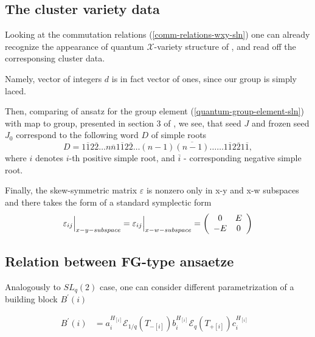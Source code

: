 \documentclass{article}
\newcommand{\lb}{\left (}
\newcommand{\rb}{\right )}
\newcommand{\lsb}{\left [}
\newcommand{\rsb}{\right ]}
\newcommand{\SB}[1]{\lsb #1 \rsb}
\newcommand{\ve}{\varepsilon}
\newcommand {\?}{\textit{???}}
\newcommand{\me}[0]{\mathcal{E}}
\newcommand{\Bp}[1]{B^{'}\lb #1 \rb}
\newcommand{\Tp}[1][]{T_{+ #1}}
\newcommand{\Tm}[1][]{T_{- #1}}
\newcommand{\delabel}[1]{(\ref{#1})}
\begin{document}
\subsection{The cluster variety data}

Looking at the commutation relations \delabel{comm-relations-wxy-sln} one can already
recognize the appearance of quantum $\mathcal{X}$-variety structure of \cite{FG1},
and read off the corresponsing cluster data.

Namely, vector of integers $d$ is in fact vector of ones, since our group is simply laced.

Then, comparing of ansatz for the group element \delabel{quantum-group-element-sln}
with map to group, presented in section 3 of \cite{FG2}, we see, that
seed $J$ and frozen seed $J_0$ correspond to the following word $D$ of simple roots
\begin{equation}
D = 1 \overline{1} 2 \overline{2} \dots n \overline{n} 1 \overline{1} 2 \overline{2} \dots (n - 1)\overline{(n-1)}
\dots \dots 1 \overline{1} 2 \overline{2} 1 \overline{1},
\end{equation}
where $i$ denotes $i$-th positive simple root, and $\overline{i}$ - corresponding negative simple root.

Finally, the skew-symmetric matrix $\ve$ is nonzero only in x-y and x-w subspaces and
there takes the form of a standard symplectic form
\begin{equation}
  \ve_{ij} \Big{|}_{x-y-subspace} = \ve_{ij} \Big{|}_{x-w-subspace} = \lb \begin{array}{cc} 0 & E \\ -E & 0 \end{array} \rb
\end{equation}


\subsection{Relation between FG-type ansaetze}

Analogously to $SL_q(2)$ case, one can consider different parametrization
of a building block $\Bp{i}$

\begin{align}
\label{building-block-alt-sln-fg}
\Bp{i} & = a_i^{H_{\SB{i}}} \me_{1/q} \lb \Tm[\SB{i}] \rb b_i^{H_{\SB{i}}} \me_{q} \lb \Tp[\SB{i}] \rb c_i^{H_{\SB{i}}} &
\end{align}
\end{document}
